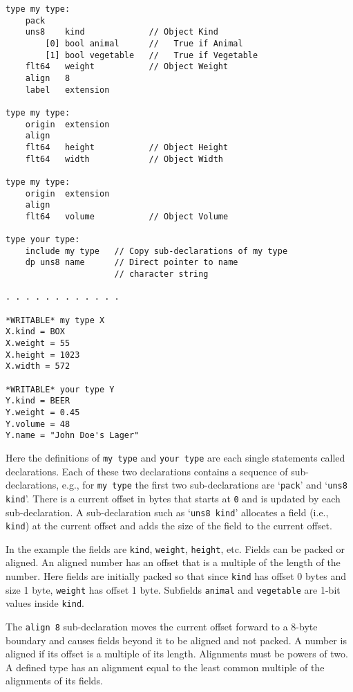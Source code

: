 \documentclass[12pt]{article}
\newenvironment{indpar}[1][0.3in]%
	{\begin{list}{}%
		     {\setlength{\itemsep}{0in}%
		      \setlength{\topsep}{0in}%
		      \setlength{\parsep}{1ex}%
		      \setlength{\labelwidth}{#1}%
		      \setlength{\leftmargin}{#1}%
		      \addtolength{\leftmargin}{\labelsep}}%
	 \item}%
	{\end{list}}
\begin{document}
\begin{indpar}\begin{verbatim}
type my type:
    pack
    uns8    kind             // Object Kind
        [0] bool animal      //   True if Animal
        [1] bool vegetable   //   True if Vegetable
    flt64   weight           // Object Weight
    align   8
    label   extension

type my type:
    origin  extension
    align
    flt64   height           // Object Height
    flt64   width            // Object Width

type my type:
    origin  extension
    align
    flt64   volume           // Object Volume

type your type:
    include my type   // Copy sub-declarations of my type
    dp uns8 name      // Direct pointer to name
                      // character string

. . . . . . . . . . . .

*WRITABLE* my type X
X.kind = BOX
X.weight = 55
X.height = 1023
X.width = 572

*WRITABLE* your type Y
Y.kind = BEER
Y.weight = 0.45
Y.volume = 48
Y.name = "John Doe's Lager"
\end{verbatim}\end{indpar}

Here the definitions of {\tt my type} and {\tt your type} are each
single statements called declarations.  Each of these two
declarations contains a sequence of sub-declarations, e.g.,
for {\tt my type} the first two sub-declarations are
`{\tt pack}' and `{\tt uns8 kind}'.  There is a current
offset in bytes that starts at {\tt 0} and is updated by each sub-declaration.
A sub-declaration such as `{\tt uns8 kind}' allocates a field
(i.e., {\tt kind})
at the current offset and adds the size of the field to the
current offset.

In the example the fields are {\tt kind}, {\tt weight}, {\tt height}, etc.
Fields can be packed or aligned.  An aligned number has an offset
that is a multiple of the length of the number.
Here fields are initially packed
so that since {\tt kind} has offset 0 bytes and size 1 byte,
{\tt weight} has offset 1 byte.  Subfields {\tt animal}
and {\tt vegetable} are 1-bit values inside {\tt kind}.

The {\tt align 8} sub-declaration moves the current offset
forward to a 8-byte boundary and causes fields beyond it
to be aligned and not packed.  A number is aligned if
its offset is a multiple of its length.  Alignments must be powers of two.
A defined type has an
alignment equal to the least common multiple of the
alignments of its fields.
\end{document}
